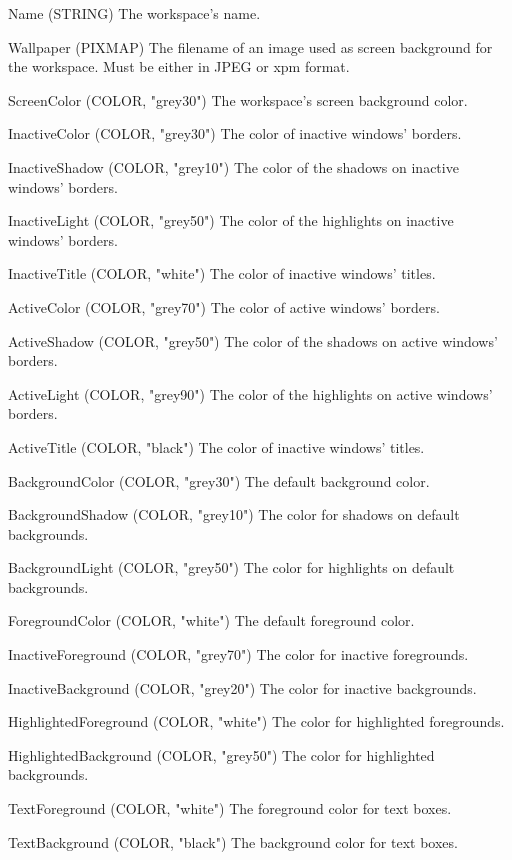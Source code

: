 \documentclass[10pt,a4paper]{article}
\newenvironment{ttdesc}[1]{
   \begin{list}{}{
          \renewcommand{\makelabel}[1]{\texttt{##1\hfill}}}}{\end{list}}
\begin{document}
\begin{ttdesc}{description}
\item[Name (STRING)] The workspace's name.
\item[Wallpaper (PIXMAP)] The filename of an image used as screen background
for the workspace. Must be either in JPEG or xpm format.
\item[ScreenColor (COLOR, "grey30")] The workspace's screen background color.
\item[InactiveColor (COLOR, "grey30")] The color of inactive windows' borders.
\item[InactiveShadow (COLOR, "grey10")] The color of the shadows on inactive
windows' borders.
\item[InactiveLight (COLOR, "grey50")] The color of the highlights on inactive
windows' borders.
\item[InactiveTitle (COLOR, "white")] The color of inactive windows' titles.
\item[ActiveColor (COLOR, "grey70")] The color of active windows' borders.
\item[ActiveShadow (COLOR, "grey50")] The color of the shadows on active
windows' borders.
\item[ActiveLight (COLOR, "grey90")] The color of the highlights on active
windows' borders.
\item[ActiveTitle (COLOR, "black")] The color of inactive windows' titles.
\item[BackgroundColor (COLOR, "grey30")] The default background color.
\item[BackgroundShadow (COLOR, "grey10")] The color for shadows on default
backgrounds.
\item[BackgroundLight (COLOR, "grey50")] The color for highlights on default
backgrounds.
\item[ForegroundColor (COLOR, "white")] The default foreground color.
\item[InactiveForeground (COLOR, "grey70")] The color for inactive
foregrounds.
\item[InactiveBackground (COLOR, "grey20")] The color for inactive
backgrounds.
\item[HighlightedForeground (COLOR, "white")] The color for highlighted
foregrounds.
\item[HighlightedBackground (COLOR, "grey50")] The color for highlighted
backgrounds.
\item[TextForeground (COLOR, "white")] The foreground color for text boxes.
\item[TextBackground (COLOR, "black")] The background color for text boxes.
\end{ttdesc}
\end{document}
